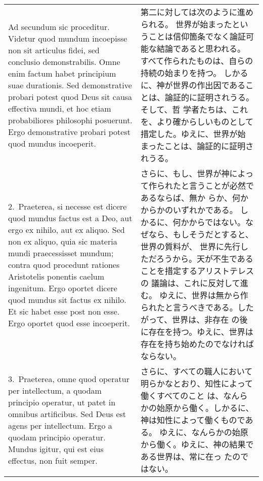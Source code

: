 \documentclass[10pt]{jsarticle} %
\begin{document}
\begin{longtable}{p{21em}p{21em}}

{\LARGE A}{\sc d secundum sic proceditur}. Videtur quod mundum
 incoepisse non sit articulus fidei, sed conclusio demonstrabilis. Omne
 enim factum habet principium suae durationis. Sed demonstrative probari
 potest quod Deus sit causa effectiva mundi, et hoc etiam probabiliores
 philosophi posuerunt. Ergo demonstrative probari potest quod mundus
 incoeperit.


&
第二に対しては次のように進められる。
世界が始まったということは信仰箇条でなく論証可能な結論であると思われる。
すべて作られたものは、自らの持続の始まりを持つ。
しかるに、神が世界の作出因であることは、論証的に証明されうる。そして、哲
 学者たちは、これを、より確からしいものとして措定した。ゆえに、世界が始
 まったことは、論証的に証明されうる。



\\

2.~{\sc Praeterea}, si necesse est dicere quod mundus factus est a Deo,
 aut ergo ex nihilo, aut ex aliquo. Sed non ex aliquo, quia sic materia
 mundi praecessisset mundum; contra quod procedunt rationes Aristotelis
 ponentis caelum ingenitum. Ergo oportet dicere quod mundus sit factus
 ex nihilo. Et sic habet esse post non esse. Ergo oportet quod esse
 incoeperit.


&

さらに、もし、世界が神によって作られたと言うことが必然であるならば、無か
 らか、何かからかのいずれかである。
しかるに、何かからではない。なぜなら、もしそうだとすると、世界の質料が、
 世界に先行しただろうから。天が不生であることを措定するアリストテレスの
 議論は、これに反対して進む。
ゆえに、世界は無から作られたと言うべきである。したがって、世界は、非存在
 の後に存在を持つ。ゆえに、世界は存在を持ち始めたのでなければならない。

\\


3.~{\sc Praeterea}, omne quod operatur per intellectum, a quodam
 principio operatur, ut patet in omnibus artificibus. Sed Deus est agens
 per intellectum. Ergo a quodam principio operatur. Mundus igitur, qui
 est eius effectus, non fuit semper.


&


さらに、すべての職人において明らかなとおり、知性によって働くすべてのこと
 は、なんらかの始原から働く。しかるに、神は知性によって働くものである。
 ゆえに、なんらかの始原から働く。ゆえに、神の結果である世界は、常に在っ
 たのではない。


\end{longtable}
\end{document}

